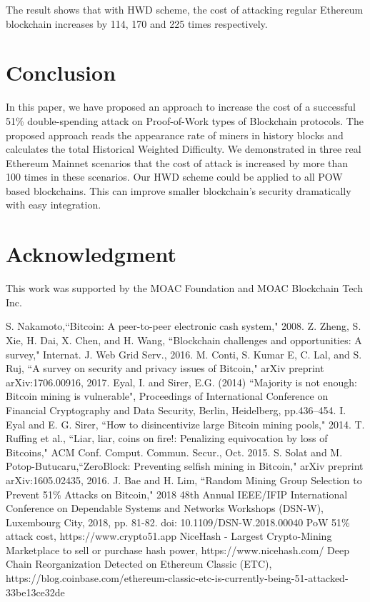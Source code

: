 \documentclass[conference]{IEEEtran}
\begin{document}
The result shows that with HWD scheme, the cost of attacking regular Ethereum blockchain increases by 114, 170 and 225 times respectively.


\section{Conclusion}
 
In this paper, we have proposed an approach to increase the cost of a successful 51\% double-spending attack on Proof-of-Work types of Blockchain protocols. The proposed approach reads the appearance rate of miners in history blocks and calculates the total Historical Weighted Difficulty. We demonstrated in three real Ethereum Mainnet scenarios that the cost of attack is increased by more than 100 times in these scenarios.
Our HWD scheme could be applied to all POW based blockchains. This can improve smaller blockchain's security dramatically with easy integration. 

\section*{Acknowledgment}

This work was supported by the MOAC Foundation and MOAC Blockchain Tech Inc.

\begin{thebibliography}{00}

 S. Nakamoto,``Bitcoin: A peer-to-peer electronic cash system," 2008.
 Z. Zheng, S. Xie, H. Dai, X. Chen, and H. Wang, ``Blockchain challenges
and opportunities: A survey," Internat. J. Web Grid Serv., 2016.
M. Conti, S. Kumar E, C. Lal, and S. Ruj, ``A survey on security and privacy issues of Bitcoin," arXiv preprint arXiv:1706.00916, 2017.
 Eyal, I. and Sirer, E.G. (2014) ``Majority is not enough: Bitcoin mining is vulnerable", Proceedings
of International Conference on Financial Cryptography and Data Security, Berlin, Heidelberg,
pp.436–454.
 I. Eyal and E. G. Sirer, ``How to disincentivize large Bitcoin mining pools," 2014.
 T. Ruffing et al., “Liar, liar, coins on fire!: Penalizing equivocation by loss of Bitcoins," ACM Conf. Comput. Commun. Secur., Oct. 2015.
 S. Solat and M. Potop-Butucaru,``ZeroBlock: Preventing selfish mining in Bitcoin," arXiv preprint arXiv:1605.02435, 2016.
 J. Bae and H. Lim, ``Random Mining Group Selection to Prevent 51\% Attacks on Bitcoin," 2018 48th Annual IEEE/IFIP International Conference on Dependable Systems and Networks Workshops (DSN-W), Luxembourg City, 2018, pp. 81-82. 
doi: 10.1109/DSN-W.2018.00040
 PoW 51\% attack cost, https://www.crypto51.app
 NiceHash - Largest Crypto-Mining Marketplace to sell or purchase hash power, https://www.nicehash.com/
 Deep Chain Reorganization Detected on Ethereum Classic (ETC), https://blog.coinbase.com/ethereum-classic-etc-is-currently-being-51-attacked-33be13ce32de

\end{thebibliography}
\vspace{12pt}
\color{red}
\end{document}

